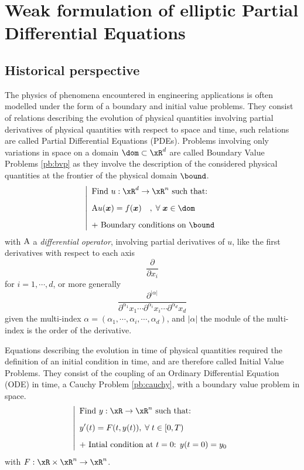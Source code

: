 
\chapter[Weak formulation of elliptic PDEs]{Weak formulation of elliptic Partial Differential Equations}\label{sec:wf}

\section{Historical perspective}

The physics of phenomena encountered in engineering applications is often modelled under the form of a boundary and initial value problems.
They consist of relations describing the evolution of physical quantities involving partial derivatives of physical quantities with respect to space and time, such relations are called Partial Differential Equations (PDEs).
Problems involving only variations in space on a domain $\dom \subset \xR^d$ are called Boundary Value Problems \eqref{pb:bvp} as they involve the description of the considered physical quantities at the frontier of the physical domain $\bound$.
\begin{equation}\label{pb:bvp}
\left\lvert
\begin{array}{ll}
\mbox{Find $u: \xR^d \rightarrow \xR^n$ such that:}\\[2ex]
\displaystyle\matA u(\xx) = f(\xx)\quad,\;\forany  \xx\in \dom\\[2ex]
\mbox{+ Boundary conditions on $\bound$}
\end{array}
\right .
\end{equation}
with ${\mathrm A}$ a \textit{differential operator}, \ie involving partial derivatives of $u$, like the first derivatives with respect to each axis
\[
\displaystyle \frac{\partial}{\partial x_i}
\]
for $i = 1,\cdots,d$, or more generally
\[
\displaystyle \frac{\partial^{|\alpha|}}{\partial^{\alpha_1}x_1\cdots\partial^{\alpha_i}x_i\cdots\partial^{\alpha_d}x_d}
\]
given the multi-index $\alpha = (\alpha_1, \cdots, \alpha_i, \cdots, \alpha_d)$, and $|\alpha|$ the module of the multi-index is the order of the derivative.

\medskip
Equations describing the evolution in time of physical quantities required the definition of an initial condition in time, and are therefore called Initial Value Problems.
They consist of the coupling of an Ordinary Differential Equation (ODE) in time, a Cauchy Problem \eqref{pb:cauchy}, with a boundary value problem in space.
\begin{equation}\label{pb:cauchy}
\left\lvert
\begin{array}{ll}
\mbox{Find $y: \xR \rightarrow \xR^n$ such that:}\\[2ex]
\displaystyle y'(t) = F(t, y(t)),\;\forany  t\in [0,T)\\[2ex]
\mbox{+ Intial condition at $t = 0$: $y(t=0) = y_0$}
\end{array}
\right .
\end{equation}
with $F:\xR\times\xR^n \rightarrow \xR^n$.

